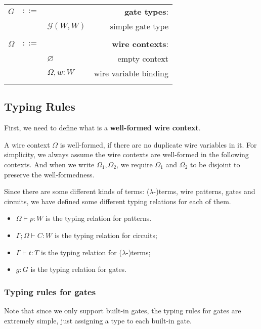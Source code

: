 \begin{longtable}[c]{lclr}
  $G$ &$::=$ &  &\textbf{gate types}:\\
      & &$\mathcal{G}(W, W)$ &simple gate type\\
  \\

  $\Omega$ &$::=$ &  &\textbf{wire contexts}: \\
      & &$\varnothing$ &empty context\\
      & &$\Omega,w:W$ &wire variable binding\\
  \\

  \bottomrule
  
\end{longtable}

\subsection{Typing Rules}
First, we need to define what is a \textbf{well-formed wire context}.
\begin{Def}
  A wire context $\Omega$ is well-formed, if there are no duplicate wire variables in it.
  For simplicity, we always assume the wire contexts are well-formed in the following contexts. And when we write $\Omega_1, \Omega_2$, we require $\Omega_1$ and $\Omega_2$ to be disjoint to preserve the well-formedness.
\end{Def}

Since there are some different kinds of terms: ($\lambda$-)terms, wire patterns, gates and circuits, we have defined some different typing relations for each of them.
\begin{itemize}
  \item $\Omega \vdash p : W$ is the typing relation for patterns.
  \item $\Gamma ; \Omega \vdash C : W$ is the typing relation for circuits;
  \item $\Gamma \vdash t:T$ is the typing relation for ($\lambda$-)terms;
  \item $g : G$ is the typing relation for gates.
\end{itemize}

\subsubsection{Typing rules for gates}
Note that since we only support built-in gates, the typing rules for gates are extremely simple, just assigning a type to each built-in gate.

